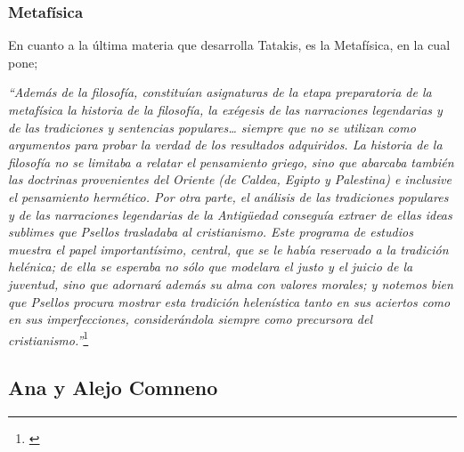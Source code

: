 \subsubsection{Metafísica}
En cuanto a la última materia que desarrolla Tatakis, 
es la Metafísica, en la cual pone;

\textit{“Además de la filosofía, constituían asignaturas de la etapa 
preparatoria de la metafísica la historia de la filosofía, 
la exégesis de las narraciones legendarias y de las tradiciones 
y sentencias populares… siempre que no se utilizan como argumentos 
para probar la verdad de los resultados adquiridos. 
La historia de la filosofía no se limitaba  a relatar el pensamiento 
griego, sino que abarcaba también las doctrinas provenientes del 
Oriente (de Caldea, Egipto y Palestina) e inclusive el pensamiento 
hermético. 
Por otra parte, el análisis de las tradiciones populares y de las 
narraciones legendarias de la Antigüedad conseguía extraer de ellas 
ideas sublimes que Psellos trasladaba al cristianismo. 
Este programa de estudios muestra el papel importantísimo, central, 
que se le había reservado a la tradición helénica; 
de ella se esperaba no sólo que modelara el justo y el juicio de la 
juventud, sino que adornará además su alma con valores morales; 
y notemos bien que Psellos procura mostrar esta tradición helenística 
tanto en sus aciertos como en sus imperfecciones, 
considerándola siempre como precursora del cristianismo.”}\footnote{\cite[p.~165]{filosofia}}

\subsection{Ana y Alejo Comneno}



